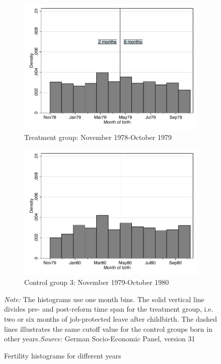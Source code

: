 \documentclass[a4paper ]{article}
\begin{document}
\begin{landscape}
\begin{figure}[p]
\begin{subfigure}[h]{0.7\textwidth}\centering
	\caption{Treatment group: November 1978-October 1979}
	\includegraphics[width=\textwidth]{../../analysis/graphs/SOEP/fertilityhist.pdf}
\end{subfigure}
\quad
\begin{subfigure}[h]{0.7\textwidth}\centering
	\caption{Control group 3: November 1979-October 1980}
	\includegraphics[width=\textwidth]{../../analysis/graphs/SOEP/fertilityhistcntrl3.pdf}
\end{subfigure}

\begin{adjustwidth}{2cm}{}
\caption{Fertility histograms for different years}\label{fig:appdx_hist}
\begin{minipage}{1.35\textwidth} %
{\footnotesize \textit{Note:} The histograms use one month bins. The solid vertical line divides pre- and post-reform time span for the treatment group, i.e. two or six months of job-protected leave after childbirth. The dashed lines illustrates the same cutoff value for the control groups born in other years.\newline \textit{Source: }German Socio-Economic Panel, version 31\par}
\end{minipage}
\end{adjustwidth}


\end{figure}
\end{landscape}
\end{document}
